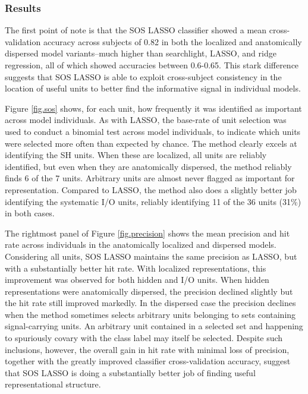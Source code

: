 \subsubsection{Results}
The first point of note is that the SOS LASSO classifier showed a mean cross-validation accuracy across subjects of 0.82 in both the localized and anatomically dispersed model variants--much higher than searchlight, LASSO, and ridge regression, all of which showed accuracies between 0.6-0.65. This stark difference suggests that SOS LASSO is able to exploit cross-subject consistency in the location of useful units to better find the informative signal in individual models.

Figure \ref{fig.sos} shows, for each unit, how frequently it was identified as important across model individuals. As with LASSO, the base-rate of unit selection was used to conduct a binomial test across model individuals, to indicate which units were selected more often than expected by chance. The method clearly excels at identifying the SH units. When these are localized, all units are reliably identified, but even when they are anatomically dispersed, the method reliably finds 6 of the 7 units. Arbitrary units are almost never flagged as important for representation. Compared to LASSO, the method also does a slightly better job identifying the systematic I/O units, reliably identifying 11 of the 36 units (31\%) in both cases.

The rightmost panel of Figure \ref{fig.precision} shows the mean precision and hit rate across individuals in the anatomically localized and dispersed models. Considering all units, SOS LASSO maintains the same precision as LASSO, but with a substantially better hit rate. With localized representations, this improvement was observed for both hidden and I/O units. When hidden representations were anatomically dispersed, the precision declined slightly but the hit rate still improved markedly. In the dispersed case the precision declines when the method sometimes selects arbitrary units belonging to sets containing signal-carrying units. An arbitrary unit contained in a selected set and happening to spuriously covary with the class label may itself be selected. Despite such inclusions, however, the overall gain in hit rate with minimal loss of precision, together with the greatly improved classifier cross-validation accuracy, suggest that SOS LASSO is doing a substantially better job of finding useful representational structure.

